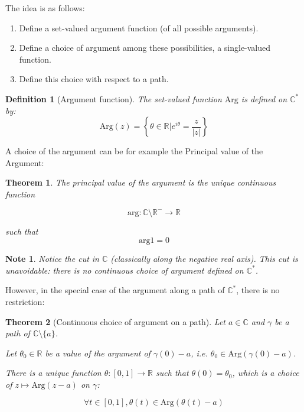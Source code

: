 \documentclass{article}
\newtheorem*{defi}{Definition}
\newtheorem*{note}{Note}
\newtheorem*{thm*}{Theorem}
\begin{document}
The idea is as follows:
\begin{enumerate}
    \item Define a set-valued argument function (of all possible arguments).
    \item Define a choice of argument among these possibilities, a single-valued function.
    \item Define this choice with respect to a path.
\end{enumerate}

\begin{defi}[Argument function]
    The set-valued function $\mathrm{Arg}$ is defined on $\mathbb{C}^*$ by:
$$ \mathrm{Arg}(z) = \left \lbrace \theta \in \mathbb{R} \bigg\vert e^{i\theta} = \frac{z}{|z|}\right \rbrace$$
\end{defi}

A choice of the argument can be for example the Principal value of the Argument:

\begin{thm*}
    The principal value of the argument is the unique continuous function

    $$\mathrm{arg}: \mathbb{C} \setminus \mathbb{R}^{-} \rightarrow \mathbb{R}$$

    such that $$ \mathrm{arg} 1 = 0$$ 
\end{thm*}

\begin{note}
    Notice the \emph{cut} in $\mathbb{C}$ (classically along the negative real axis). This cut is unavoidable: there is no continuous choice of argument defined on $\mathbb{C}^*$.
\end{note}

However, in the special case of the argument along a path of $\mathbb{C}^*$, there is no restriction:

\begin{thm*}[Continuous choice of argument on a path]
    Let $a\in\mathbb{C}$ and $\gamma$ be a path of $\mathbb{C} \setminus \lbrace a \rbrace$.

    Let $\theta_0\in\mathbb{R}$ be a value of the argument of $\gamma(0) - a$, i.e. $\theta_0 \in \mathrm{Arg}(\gamma(0) - a)$.

    There is a unique function $\theta: [0,1] \rightarrow \mathbb{R}$ such that $\theta(0) = \theta_0$, which is a choice of $z \mapsto \mathrm{Arg}(z-a)$ on $\gamma$:

    $$\forall t \in [0,1], \theta(t) \in \mathrm{Arg}(\theta(t) - a) $$
\end{thm*}
\end{document}
